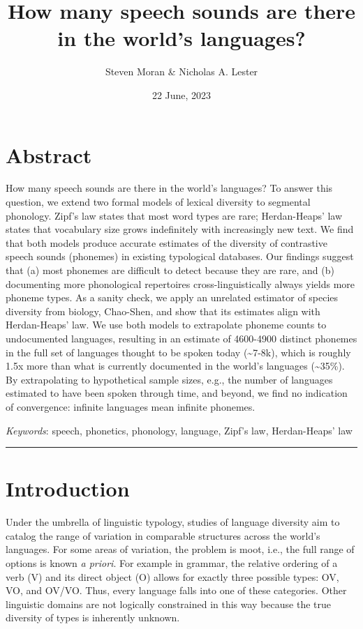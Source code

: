 \documentclass[
]{article}
\title{How many speech sounds are there in the world's languages?}
\author{Steven Moran \& Nicholas A. Lester}
\date{22 June, 2023}
\begin{document}
\maketitle

\hypertarget{abstract}{%
\section*{Abstract}\label{abstract}}

How many speech sounds are there in the world's languages? To answer
this question, we extend two formal models of lexical diversity to
segmental phonology. Zipf's law states that most word types are rare;
Herdan-Heaps' law states that vocabulary size grows indefinitely with
increasingly new text. We find that both models produce accurate
estimates of the diversity of contrastive speech sounds (phonemes) in
existing typological databases. Our findings suggest that (a) most
phonemes are difficult to detect because they are rare, and (b)
documenting more phonological repertoires cross-linguistically always
yields more phoneme types. As a sanity check, we apply an unrelated
estimator of species diversity from biology, Chao-Shen, and show that
its estimates align with Herdan-Heaps' law. We use both models to
extrapolate phoneme counts to undocumented languages, resulting in an
estimate of 4600-4900 distinct phonemes in the full set of languages
thought to be spoken today (\textasciitilde7-8k), which is roughly 1.5x
more than what is currently documented in the world's languages
(\textasciitilde35\%). By extrapolating to hypothetical sample sizes,
e.g., the number of languages estimated to have been spoken through
time, and beyond, we find no indication of convergence: infinite
languages mean infinite phonemes.

\emph{Keywords}: speech, phonetics, phonology, language, Zipf's law,
Herdan-Heaps' law

\begin{center}\rule{0.5\linewidth}{0.5pt}\end{center}

\hypertarget{introduction}{%
\section{Introduction}\label{introduction}}

Under the umbrella of linguistic typology, studies of language diversity
aim to catalog the range of variation in comparable structures across
the world's languages. For some areas of variation, the problem is moot,
i.e., the full range of options is known \emph{a priori}. For example in
grammar, the relative ordering of a verb (V) and its direct object (O)
allows for exactly three possible types: OV, VO, and OV/VO. Thus, every
language falls into one of these categories. Other linguistic domains
are not logically constrained in this way because the true diversity of
types is inherently unknown.
\end{document}
